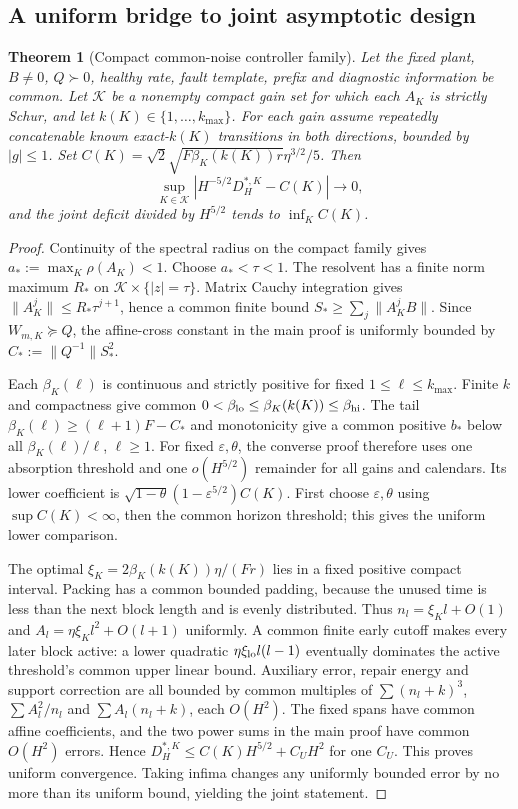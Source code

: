 \documentclass[11pt]{article}
\newtheorem{theorem}{Theorem}
\begin{document}
\subsection{A uniform bridge to joint asymptotic design}
\begin{theorem}[Compact common-noise controller family]\label{thm:uniform}
Let the fixed plant, $B\ne0$, $Q\succ0$, healthy rate, fault template,
prefix and diagnostic information be common. Let $\mathcal K$ be a nonempty
compact gain set for which each $A_K$ is strictly Schur, and let
$k(K)\in\{1,\ldots,k_{\max}\}$. For each gain assume repeatedly concatenable
known exact-$k(K)$ transitions in both directions, bounded by $|g|\le1$.
Set $C(K)=\sqrt2\sqrt{F\beta_K(k(K))r}\eta^{3/2}/5$. Then
\[
\sup_{K\in\mathcal K}|H^{-5/2}D_H^{*,K}-C(K)|\longrightarrow0,
\]
and the joint deficit divided by $H^{5/2}$ tends to $\inf_K C(K)$.
\end{theorem}
\begin{proof}
Continuity of the spectral radius on the compact family gives
$a_*:=\max_K\rho(A_K)<1$. Choose $a_*<\tau<1$.
The resolvent has a finite norm maximum $R_*$ on
$\mathcal K\times\{|z|=\tau\}$. Matrix Cauchy integration gives
$\|A_K^j\|\le R_*\tau^{j+1}$, hence a common finite bound
$S_*\ge\sum_j\|A_K^jB\|$.
Since $W_{m,K}\succeq Q$, the affine-cross constant in the main proof is
uniformly bounded by $C_*:=\|Q^{-1}\|S_*^2$.

Each $\beta_K(\ell)$ is continuous and strictly positive for fixed
$1\le\ell\le k_{\max}$. Finite $k$ and compactness give common
$0<\beta_{\rm lo}\le\beta_K(k(K))\le\beta_{\rm hi}$.
The tail $\beta_K(\ell)\ge(\ell+1)F-C_*$ and monotonicity give
a common positive $b_*$ below all $\beta_K(\ell)/\ell$, $\ell\ge1$.
For fixed $\varepsilon,\theta$, the converse proof therefore uses one
absorption threshold and one $o(H^{5/2})$ remainder for all gains and calendars.
Its lower coefficient is
$\sqrt{1-\theta}(1-\varepsilon^{5/2})C(K)$.
First choose $\varepsilon,\theta$ using $\sup C(K)<\infty$, then the common
horizon threshold; this gives the uniform lower comparison.

The optimal $\xi_K=2\beta_K(k(K))\eta/(Fr)$ lies in a fixed positive compact
interval. Packing has a common bounded padding, because the unused time is
less than the next block length and is evenly distributed.
Thus $n_l=\xi_Kl+O(1)$ and $A_l=\eta\xi_Kl^2+O(l+1)$ uniformly.
A common finite early cutoff makes every later block active: a lower quadratic
$\eta\xi_{\rm lo}l(l-1)$ eventually dominates the active threshold's common
upper linear bound. Auxiliary error, repair energy and support correction
are all bounded by common multiples of
$\sum(n_l+k)^3$, $\sum A_l^2/n_l$ and $\sum A_l(n_l+k)$, each $O(H^2)$.
The fixed spans have common affine coefficients, and the two power sums in
the main proof have common $O(H^2)$ errors. Hence
$D_H^{*,K}\le C(K)H^{5/2}+C_UH^2$ for one $C_U$.
This proves uniform convergence. Taking infima changes any uniformly bounded
error by no more than its uniform bound, yielding the joint statement.
\end{proof}
\end{document}
